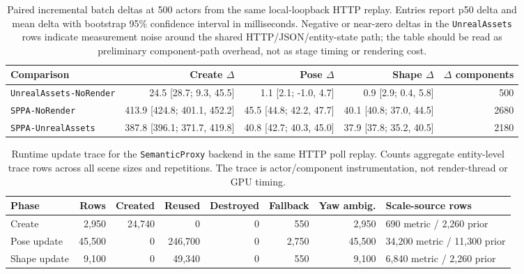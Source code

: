 ﻿\documentclass[11pt,a4paper]{article}
\begin{document}
\begin{table}[H]
\centering
\scriptsize
\setlength{\tabcolsep}{3pt}
\caption{Paired incremental batch deltas at 500 actors from the same
local-loopback HTTP replay. Entries report p50 delta and mean delta with
bootstrap 95\% confidence interval in milliseconds. Negative or near-zero
deltas in the \texttt{UnrealAssets} rows indicate measurement noise around the
shared HTTP/JSON/entity-state path; the table should be read as preliminary
component-path overhead, not as stage timing or rendering cost.}
\label{tab:http-poll-deltas}
\begin{tabular}{@{}lrrrr@{}}
\toprule
Comparison & Create $\Delta$ & Pose $\Delta$ & Shape $\Delta$ & $\Delta$ components \\
\midrule
\texttt{UnrealAssets-NoRender} & 24.5 [28.7; 9.3, 45.5] & 1.1 [2.1; -1.0, 4.7] & 0.9 [2.9; 0.4, 5.8] & 500 \\
\texttt{SPPA-NoRender} & 413.9 [424.8; 401.1, 452.2] & 45.5 [44.8; 42.2, 47.7] & 40.1 [40.8; 37.0, 44.5] & 2680 \\
\texttt{SPPA-UnrealAssets} & 387.8 [396.1; 371.7, 419.8] & 40.8 [42.7; 40.3, 45.0] & 37.9 [37.8; 35.2, 40.5] & 2180 \\
\bottomrule
\end{tabular}
\end{table}

\begin{table}[H]
\centering
\tiny
\setlength{\tabcolsep}{2pt}
\caption{Runtime update trace for the \texttt{SemanticProxy} backend in the
same HTTP poll replay. Counts aggregate entity-level trace rows across all
scene sizes and repetitions. The trace is actor/component instrumentation, not
render-thread or GPU timing.}
\label{tab:http-poll-update-trace}
\begin{tabular}{@{}lrrrrrrp{2.4cm}@{}}
\toprule
Phase & Rows & Created & Reused & Destroyed & Fallback & Yaw ambig. & Scale-source rows \\
\midrule
Create & 2,950 & 24,740 & 0 & 0 & 550 & 2,950 & 690 metric / 2,260 prior \\
Pose update & 45,500 & 0 & 246,700 & 0 & 2,750 & 45,500 & 34,200 metric / 11,300 prior \\
Shape update & 9,100 & 0 & 49,340 & 0 & 550 & 9,100 & 6,840 metric / 2,260 prior \\
\bottomrule
\end{tabular}
\end{table}
\end{document}
